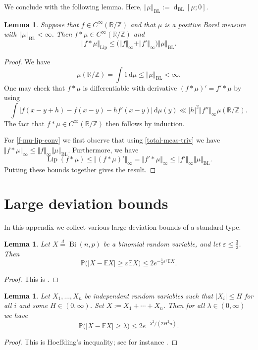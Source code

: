 \documentclass[11pt,reqno]{amsart}
\numberwithin{equation}{section}
\newtheorem{lemma}[theorem]{Lemma}
\theoremstyle{definition}
\theoremstyle{remark}
\newcommand{\mb}{\mathbb}
\newcommand{\eps}{\varepsilon}
\newcommand{\dist}[2]{{\operatorname{d}_{\operatorname{BL}}[#1;#2]}}
\def\BL{\operatorname{BL}}
\renewcommand{\le}{\leqslant}
\renewcommand{\ge}{\geqslant}
\newcommand\Z{\mathbb{Z}}
\newcommand\R{\mathbb{R}}
\newcommand\samedist{\overset{d}{=}}
\newcommand\Lip{\operatorname{Lip}}
\begin{document}
We conclude with the following lemma. Here, $\Vert \mu \Vert_{\BL} := \dist{\mu}{0}$.

\begin{lemma}\label{smooth-conv-meas}
Suppose that $f \in C^{\infty}(\R/\Z)$ and that $\mu$ is a positive Borel measure with $\Vert \mu \Vert_{\BL} < \infty$. Then $f \ast \mu \in C^{\infty}(\R/\Z)$ and
\begin{equation}\label{f-mu-lip-conv}  \Vert f \ast \mu\Vert_{\Lip} \le \big( \Vert f \Vert_{\infty} +  \Vert f'\Vert_{\infty}\big) \Vert \mu \Vert_{\BL}.\end{equation}
\end{lemma}
\begin{proof}
We have \begin{equation}\label{total-meas-triv} \mu(\R/\Z) = \int 1 \,\mathrm{d}\mu \le \Vert \mu \Vert_{\BL} < \infty.\end{equation} One may check that $f \ast \mu$ is differentiable with derivative $(f \ast \mu)' = f' \ast \mu$ by using
\[ \int \big| f(x - y + h) - f(x - y) - h f'(x - y) \big| \, \mathrm{d}\mu(y)  \ll |h|^2 \Vert f'' \Vert_{\infty} \mu(\R/\Z).\]
The fact that $f \ast \mu \in C^{\infty}(\R/\Z)$ then follows by induction.

For \cref{f-mu-lip-conv} we first observe that using \cref{total-meas-triv} we have $\Vert f \ast \mu \Vert_{\infty} \le \Vert f \Vert_{\infty} \Vert \mu \Vert_{\BL}$. 
Furthermore, we have
\[ \Lip(f \ast \mu) \le \Vert (f \ast \mu)'\Vert_{\infty} = \Vert f' \ast \mu \Vert_{\infty} \le \Vert f' \Vert_{\infty} \Vert \mu \Vert_{\BL}.\] Putting these bounds together gives the result.
\end{proof}


\section{Large deviation bounds}\label{appF}
In this appendix we collect various large deviation bounds of a standard type.


\begin{lemma}\label{binom-ld}
Let $X \samedist \operatorname{Bi}(n,p)$ be a binomial random variable, and let $\eps \le \frac{3}{2}$. Then 
\[ \mb{P} \big( |X - \mb{E} X| \ge \eps \mb{E} X\big) \le 2 e^{-\frac{1}{3}\eps^2\mb{E} X}. \]
\end{lemma}
\begin{proof}
This is \cite[(2.9)]{JLR}.
\end{proof}

\begin{lemma}\label{hoeffding-inequality}
Let $X_1,\dots, X_n$ be independent random variables such that $|X_i| \le H$ for all $i$ and some $H \in (0,\infty)$. Set $X := X_1 + \cdots + X_n$. Then for all $\lambda \in (0,\infty)$ we have
\[ \mb{P} \big( | X - \mb{E} X| \ge \lambda \big) \le 2 e^{-\lambda^2/(2H^2n)}.\]
\end{lemma}
\begin{proof} This is Hoeffding's inequality; see for instance \cite[Theorem 2.8]{BLM}.\end{proof}
\end{document}
